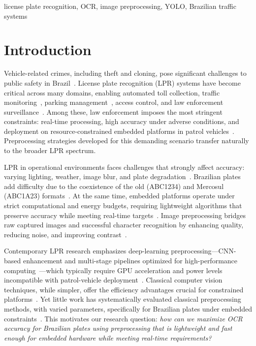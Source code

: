 \documentclass[conference,hidelinks]{IEEEtran}
\begin{document}
\begin{IEEEkeywords}
license plate recognition, OCR, image preprocessing, YOLO, Brazilian traffic systems
\end{IEEEkeywords}

\section{Introduction}

Vehicle-related crimes, including theft and cloning, pose significant challenges to public safety in Brazil~\cite{shjarback2024examining,tourani2020robust}. License plate recognition (LPR) systems have become critical across many domains, enabling automated toll collection, traffic monitoring~\cite{nguyen2022realtime}, parking management~\cite{assumpcao2024estacionamento}, access control, and law enforcement surveillance~\cite{merola2019impact,shashirangana2021automated}. Among these, law enforcement imposes the most stringent constraints: real-time processing, high accuracy under adverse conditions, and deployment on resource-constrained embedded platforms in patrol vehicles~\cite{tang2024ultra,ammar2023multistage}. Preprocessing strategies developed for this demanding scenario transfer naturally to the broader LPR spectrum.

LPR in operational environments faces challenges that strongly affect accuracy: varying lighting, weather, image blur, and plate degradation~\cite{silva2018license,xianli2021vehicle,tavares2024comparison}. Brazilian plates add difficulty due to the coexistence of the old (ABC1234) and Mercosul (ABC1A23) formats~\cite{silva2020synthetic,qin2022towards}. At the same time, embedded platforms operate under strict computational and energy budgets, requiring lightweight algorithms that preserve accuracy while meeting real-time targets~\cite{yuan2017robust,shashirangana2022automated}. Image preprocessing bridges raw captured images and successful character recognition by enhancing quality, reducing noise, and improving contrast~\cite{tavares2024comparison,wang2022rethinking,zhang2021robust}.

Contemporary LPR research emphasizes deep-learning preprocessing—CNN-based enhancement and multi-stage pipelines optimized for high-performance computing~\cite{li2019toward,chen2021endtoend}—which typically require GPU acceleration and power levels incompatible with patrol-vehicle deployment~\cite{tang2024ultra}. Classical computer vision techniques, while simpler, offer the efficiency advantages crucial for constrained platforms~\cite{shashirangana2022automated}. Yet little work has systematically evaluated classical preprocessing methods, with varied parameters, specifically for Brazilian plates under embedded constraints~\cite{silva2020synthetic}. This motivates our research question: \textit{how can we maximize OCR accuracy for Brazilian plates using preprocessing that is lightweight and fast enough for embedded hardware while meeting real-time requirements?}
\end{document}
